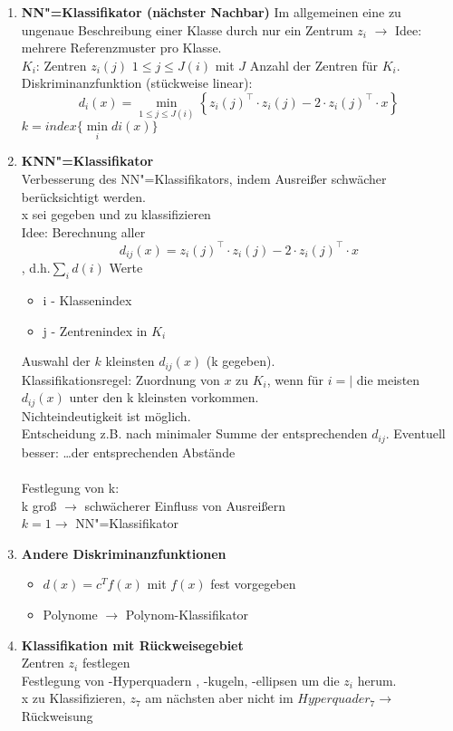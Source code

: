 \documentclass[a4paper,12pt]{scrreprt}
\newcommand{\itemd}[1]{\item{\textbf{#1}} }
\begin{document}
\begin{enumerate}
	\itemd{NN"=Klassifikator (nächster Nachbar)} Im allgemeinen eine zu ungenaue
		Beschreibung einer Klasse durch nur ein Zentrum $z_i$ $\rightarrow$
		Idee: mehrere Referenzmuster pro Klasse.\\
		$K_i$: Zentren $z_i(j)$ $1\le j\le J(i)$ mit $J$ Anzahl der
		Zentren für $K_i$.\\
		Diskriminanzfunktion (stückweise linear):\\ $$d_i(x)=\min\limits_{1\le j \le J(i)}\left\{ z_i(j)^\top\cdot z_i(j) -2\cdot z_i(j)^\top\cdot x \right\}$$
		$k = index \{ \min\limits_{i} di(x) \}$
	\itemd{KNN"=Klassifikator}\\ Verbesserung des NN"=Klassifikators, indem Ausreißer schwächer berücksichtigt werden.\\
	x sei gegeben und zu klassifizieren\\
	Idee: Berechnung aller 
	$$d_{ij}(x)=z_i(j)^\top\cdot z_i(j) -2\cdot z_i(j)^\top\cdot x$$
	, d.h.$\sum_i d(i)$ Werte
	\begin{itemize}
	 \item i - Klassenindex
	 \item j - Zentrenindex in $K_i$
	\end{itemize}
	Auswahl der $k$ kleinsten $d_{ij}(x)$ (k gegeben).\\
	Klassifikationsregel: Zuordnung von $x$ zu $K_i$, wenn für $i=|$ die meisten $d_{ij}(x)$ unter den k kleinsten vorkommen.\\
	Nichteindeutigkeit ist möglich.\\
	Entscheidung z.B. nach minimaler Summe der entsprechenden $d_{ij}$. Eventuell besser: \dots der entsprechenden Abstände\\
	\\
	Festlegung von k:\\
	k groß $\rightarrow$ schwächerer Einfluss von Ausreißern\\
	$k = 1 \rightarrow$ NN"=Klassifikator

\itemd{Andere Diskriminanzfunktionen}\\
\begin{itemize}
 \item $d(x)=c^T f(x)$ mit $f(x)$ fest vorgegeben
 \item Polynome $\rightarrow$ Polynom-Klassifikator
\end{itemize}
\itemd{Klassifikation mit Rückweisegebiet}\\
Zentren $z_i$ festlegen\\
Festlegung von -Hyperquadern , -kugeln, -ellipsen um die $z_i$ herum.\\
x zu Klassifizieren, $z_7$ am nächsten aber nicht im $Hyperquader_7 \rightarrow$ Rückweisung 
\end{enumerate}
\end{document}
